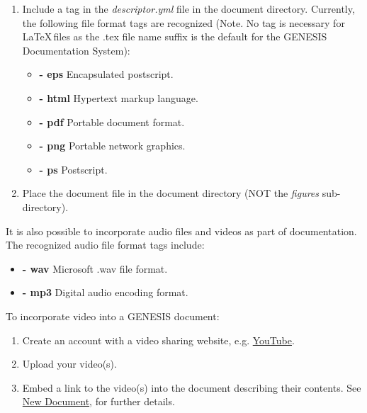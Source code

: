 \documentclass[12pt]{article}
\begin{document}
\begin{enumerate}

\item Include a tag in the {\it descriptor.yml} file in the document directory. Currently, the following file format tags are recognized (Note. No tag is necessary for  \LaTeX\,files as the .tex file name suffix is the default for the GENESIS Documentation System):

\begin{itemize}

\item[]{\bf - eps} Encapsulated postscript.
\item[]{\bf - html} Hypertext markup language.
\item[]{\bf - pdf} Portable document format.
\item[]{\bf - png} Portable network graphics.
\item[]{\bf - ps} Postscript.

\end{itemize}

\item Place the document file in the document directory (NOT the {\it figures} sub-directory).

\end{enumerate}

It is also possible to incorporate audio files and videos as part of documentation. The recognized audio file format tags include:

\begin{itemize}

\item[]{\bf - wav} Microsoft .wav file format.
\item[]{\bf - mp3} Digital audio encoding format.

\end{itemize}

To incorporate video into a GENESIS document: 

\begin{enumerate}

\item Create an account with a video sharing website, e.g. \href{http://www.youtube.com/create_account}{YouTube}.
\item Upload your video(s).
\item Embed a link to the video(s) into the document describing their contents. See \href{../NewDocument/NewDocument.tex}{New Document}, for further details.


\end{enumerate}
\end{document}
